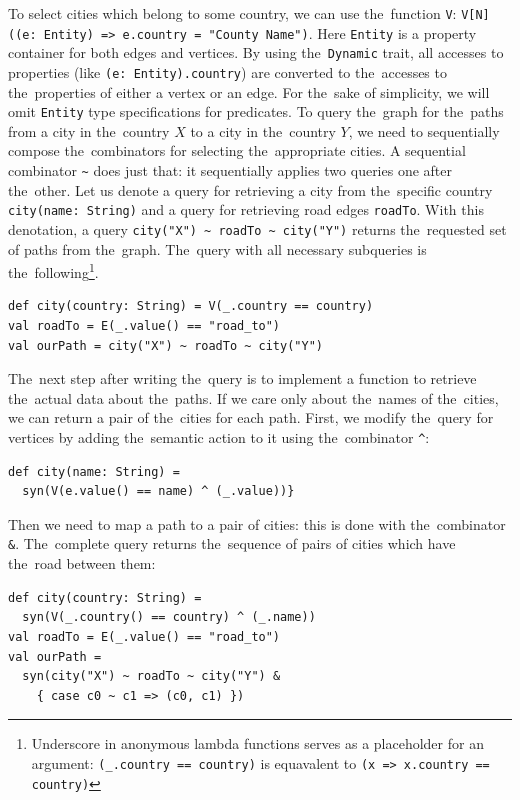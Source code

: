 To select cities which belong to some country, we can use the~function \lstinline{V}: \lstinline{V[N]((e: Entity) => e.country = "County Name")}.
Here \lstinline{Entity} is a property container for both edges and vertices.
By using the~\lstinline{Dynamic} trait, all accesses to properties (like \lstinline{(e: Entity).country}) are converted to the~accesses to the~properties of either a vertex or an edge.
For the~sake of simplicity, we will omit \lstinline{Entity} type specifications for predicates.
To query the~graph for the~paths from a city in the~country $X$ to a city in the~country $Y$, we need to sequentially compose the~combinators for selecting the~appropriate cities.
A sequential combinator \lstinline{~} does just that: it sequentially  applies two queries one after the~other.
Let us denote a query for retrieving a city from the~specific country \lstinline{city(name: String)} and a query for retrieving road edges \lstinline{roadTo}.
With this denotation, a query \lstinline{city("X") ~ roadTo ~ city("Y")} returns the~requested set of paths from the~graph.
The~query with all necessary subqueries is the~following\footnote{Underscore in anonymous lambda functions serves as a placeholder for an argument: \lstinline{(_.country == country)} is equavalent to \lstinline{(x => x.country == country)} }.

\begin{lstlisting}
def city(country: String) = V(_.country == country)
val roadTo = E(_.value() == "road_to")
val ourPath = city("X") ~ roadTo ~ city("Y")
\end{lstlisting}

The~next step after writing the~query is to implement a function to retrieve the~actual data about the~paths.
If we care only about the~names of the~cities, we can return a pair of the~cities for each path.
First, we modify the~query for vertices by adding the~semantic action to it using the~combinator \lstinline{^}:

\begin{lstlisting}
def city(name: String) =
  syn(V(e.value() == name) ^ (_.value))}
\end{lstlisting}

Then we need to map a path to a pair of cities: this is done with the~combinator \lstinline{&}.
The~complete query returns the~sequence of pairs of cities which have the~road between them:

\begin{lstlisting}
def city(country: String) =
  syn(V(_.country() == country) ^ (_.name))
val roadTo = E(_.value() == "road_to")
val ourPath =
  syn(city("X") ~ roadTo ~ city("Y") &
    { case c0 ~ c1 => (c0, c1) })
\end{lstlisting}

